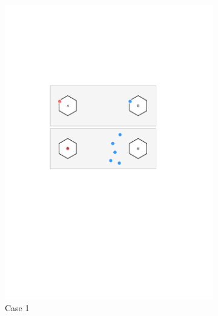 \documentclass[conference]{IEEEtran}
\begin{document}
\begin{figure}[htbp]
	\centering
	\begin{subfigure}[b]{.3\textwidth}
		\includegraphics[width=\linewidth]{Section3/case1}
		\caption{Case 1}
	\end{subfigure}
	\begin{subfigure}[b]{.3\textwidth}

\end{subfigure}
\end{figure}
\end{document}

